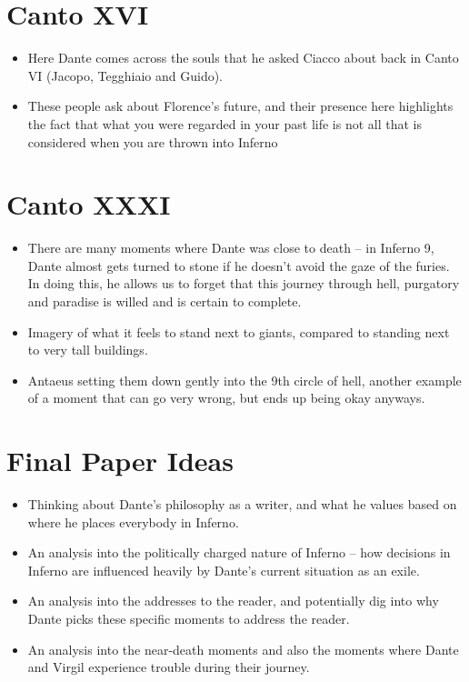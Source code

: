 \documentclass[10pt]{article}
\begin{document}
	\section{Canto XVI}
	\begin{itemize}
		\item Here Dante comes across the souls that he asked Ciacco about back in Canto VI (Jacopo, Tegghiaio
			and Guido).
		\item These people ask about Florence's future, and their presence here highlights the fact that 
			what you were regarded in your past life is not all that is considered when you are thrown 
			into Inferno
	\end{itemize}
	\section{Canto XXXI}
	\begin{itemize}
		\item There are many moments where Dante was close to death -- in Inferno 9, Dante almost gets turned to 
			stone if he doesn't avoid the gaze of the furies. In doing this, he allows us to forget that this 
			journey through hell, purgatory and paradise is willed and is certain to complete.
		\item Imagery of what it feels to stand next to giants, compared to standing next to very tall buildings.
		\item Antaeus setting them down gently into the 9th circle of hell, another example of a moment that can 
			go very wrong, but ends up being okay anyways. 
	\end{itemize}
	\section{Final Paper Ideas}
	\begin{itemize}
		\item Thinking about Dante's philosophy as a writer, and what he values based on where he places everybody
			in Inferno.
		\item An analysis into the politically charged nature of Inferno -- how decisions in Inferno are 
			influenced heavily by Dante's current situation as an exile. 
		\item An analysis into the addresses to the reader, and potentially dig into why Dante picks these 
			specific moments to address the reader.  
		\item An analysis into the near-death moments and also the moments where Dante and Virgil experience 
			trouble during their journey.
	\end{itemize}
\end{document}
